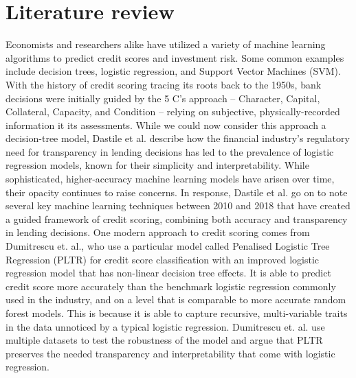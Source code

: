 \documentclass{article}
\begin{document}
\section*{Literature review}
Economists and researchers alike have utilized a variety of machine learning algorithms to predict credit scores and investment risk.
Some common examples include decision trees, logistic regression, and Support Vector Machines (SVM).
\vspace{5mm}\newline
With the history of credit scoring tracing its roots back to the 1950s, bank decisions were initially guided by the
5 C's approach -- Character, Capital, Collateral, Capacity, and Condition -- relying on subjective, physically-recorded information it its
assessments.
While we could now consider this approach a decision-tree model, Dastile et al. describe how the financial industry's regulatory need for
transparency in lending decisions has led to the prevalence of logistic regression models, known for their simplicity and interpretability.
While sophisticated, higher-accuracy machine learning models have arisen over time, their opacity continues to raise concerns.
In response, Dastile et al. go on to note several key machine learning techniques between 2010 and 2018 that have created a guided
framework of credit scoring, combining both accuracy and transparency in lending decisions.
\vspace{5mm}\newline
One modern approach to credit scoring comes from Dumitrescu et. al., who use a particular model called Penalised Logistic Tree Regression
(PLTR) for credit score classification with an improved logistic regression model that has non-linear decision tree effects.
It is able to predict credit score more accurately than the benchmark logistic regression commonly used in the industry, and on a level
that is comparable to more accurate random forest models.
This is because it is able to capture recursive, multi-variable traits in the data unnoticed by a typical logistic regression.
Dumitrescu et. al. use multiple datasets to test the robustness of the model and argue that PLTR preserves the needed transparency and
interpretability that come with logistic regression.

\newpage
\end{document}
